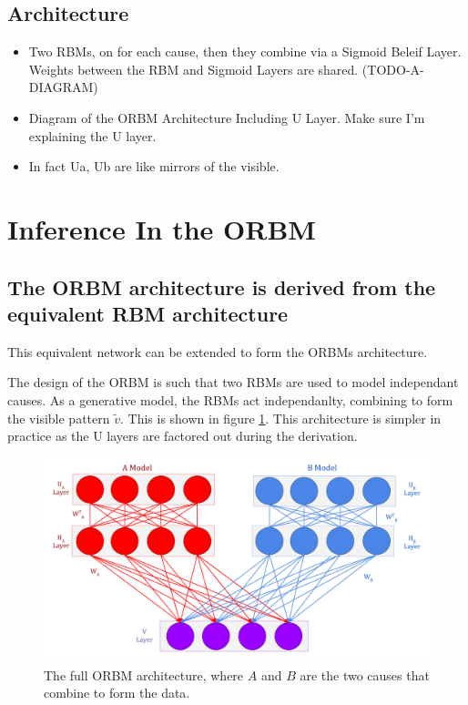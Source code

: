 \subsection{Architecture}

\begin{itemize}
    \item Two RBMs, on for each cause, then they combine via a Sigmoid Beleif Layer. Weights between the RBM and Sigmoid Layers are shared. (TODO-A-DIAGRAM)
    \item Diagram of the ORBM Architecture Including U Layer. Make sure I'm explaining the U layer.
    \item In fact Ua, Ub are like mirrors of the visible.
\end{itemize}


\section{Inference In the ORBM}

\subsection{The ORBM architecture is derived from the equivalent RBM architecture}
This equivalent network can be extended to form the ORBMs architecture.

The design of the ORBM is such that two RBMs are used to model independant causes. As a generative model, the RBMs act independanlty, combining to form the visible pattern $\tilde{v}$. This is shown in figure \ref{F:ORBM-Architecture}. This architecture is simpler in practice as the U layers are factored out during the derivation.

\begin{figure}[h]
\begin{center}
  \includegraphics[width = 7in]{Assets/ORBM-Full-Architecture.png}
\caption{The full ORBM architecture, where $A$ and $B$ are the two causes that combine to form the data.}
\label{F:ORBM-Architecture}
\end{center}
\end{figure}

